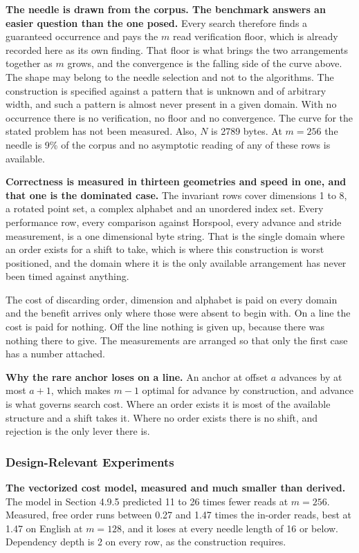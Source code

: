 \textbf{The needle is drawn from the corpus. The benchmark answers an easier question than the one posed.} Every search therefore finds a guaranteed occurrence and pays the \(m\) read verification floor, which is already recorded here as its own finding. That floor is what brings the two arrangements together as \(m\) grows, and the convergence is the falling side of the curve above. The shape may belong to the needle selection and not to the algorithms. The construction is specified against a pattern that is unknown and of arbitrary width, and such a pattern is almost never present in a given domain. With no occurrence there is no verification, no floor and no convergence. The curve for the stated problem has not been measured. Also, \(N\) is 2789 bytes. At \(m = 256\) the needle is 9\% of the corpus and no asymptotic reading of any of these rows is available.

\textbf{Correctness is measured in thirteen geometries and speed in one, and that one is the dominated case.} The invariant rows cover dimensions 1 to 8, a rotated point set, a complex alphabet and an unordered index set. Every performance row, every comparison against Horspool, every advance and stride measurement, is a one dimensional byte string. That is the single domain where an order exists for a shift to take, which is where this construction is worst positioned, and the domain where it is the only available arrangement has never been timed against anything.

The cost of discarding order, dimension and alphabet is paid on every domain and the benefit arrives only where those were absent to begin with. On a line the cost is paid for nothing. Off the line nothing is given up, because there was nothing there to give. The measurements are arranged so that only the first case has a number attached.

\textbf{Why the rare anchor loses on a line.} An anchor at offset \(a\) advances by at most \(a+1\), which makes \(m-1\) optimal for advance by construction, and advance is what governs search cost. Where an order exists it is most of the available structure and a shift takes it. Where no order exists there is no shift, and rejection is the only lever there is.

\subsubsection{Design-Relevant Experiments}

\textbf{The vectorized cost model, measured and much smaller than derived.} The model in Section 4.9.5 predicted 11 to 26 times fewer reads at \(m = 256\). Measured, free order runs between 0.27 and 1.47 times the in-order reads, best at 1.47 on English at \(m = 128\), and it loses at every needle length of 16 or below. Dependency depth is 2 on every row, as the construction requires.

